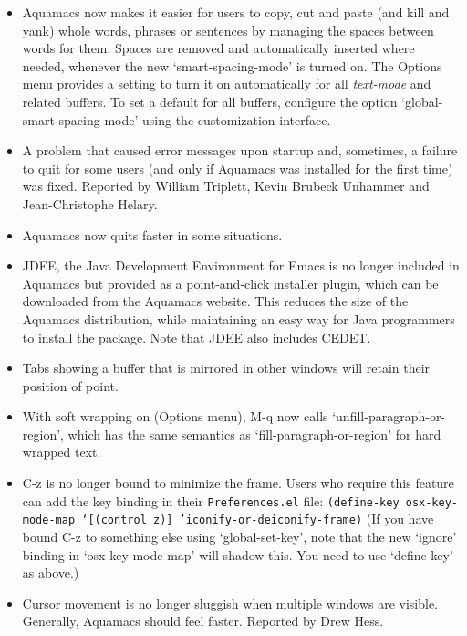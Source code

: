 \begin{itemize}

\item Aquamacs now makes it easier for users to copy, cut and paste (and kill and yank) whole words, phrases or sentences by managing the spaces between words for them.  Spaces are removed and automatically inserted where needed, whenever the new `smart-spacing-mode' is turned on.  The Options menu provides a setting to turn it on automatically for all {\em text-mode} and related buffers.  To set a default for all buffers, configure the option `global-smart-spacing-mode' using the customization interface.

\item A problem that caused error messages upon startup and, sometimes, a failure to quit for some users (and only if Aquamacs was installed for the first time) was fixed.
Reported by William Triplett, Kevin Brubeck Unhammer and Jean-Christophe Helary.

\item Aquamacs now quits faster in some situations.

\item JDEE, the Java Development Environment for Emacs is no longer included in Aquamacs but provided as a point-and-click installer plugin, which can be downloaded from the Aquamacs website.  This reduces the size of the Aquamacs distribution, while maintaining an easy way for Java programmers to install the package.  Note that JDEE also includes CEDET.

\item Tabs showing a buffer that is mirrored in other windows will retain their position of point.

\item With soft wrapping on (Options menu), M-q now calls `unfill-paragraph-or-region', which has the same semantics as `fill-paragraph-or-region' for hard wrapped text.

\item C-z is no longer bound to minimize the frame.  Users who require this feature can add the key binding in their {\tt Preferences.el} file:
{\tt    (define-key osx-key-mode-map `[(control z)] 'iconify-or-deiconify-frame)}
(If you have bound C-z to something else using `global-set-key', note that the new `ignore' binding in `osx-key-mode-map' will shadow this.  You need to use `define-key' as above.)

\item Cursor movement is no longer sluggish when multiple windows are visible.  Generally, Aquamacs should feel  faster.
Reported by Drew Hess.


\end{itemize}
